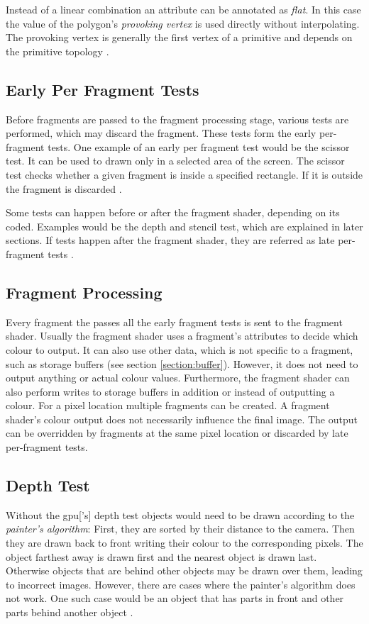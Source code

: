 Instead of a linear combination an attribute can be annotated as \textit{flat}. In this case the value of the polygon's \textit{provoking vertex} is used directly without interpolating. The provoking vertex is generally the first vertex of a primitive and depends on the primitive topology \cite{akine:2018:realtime, khronos:vulkan:spec1.1}.

\subsection{Early Per Fragment Tests}
Before fragments are passed to the fragment processing stage, various tests are performed, which may discard the fragment. These tests form the early per-fragment tests. One example of an early per fragment test would be the scissor test. It can be used to drawn only in a selected area of the screen. The scissor test checks whether a given fragment is inside a specified rectangle. If it is outside the fragment is discarded \cite{khronos:vulkan:spec1.1}. 

Some tests can happen before or after the fragment shader, depending on its coded. Examples would be the depth and stencil test, which are explained in later sections. If tests happen after the fragment shader, they are referred as late per-fragment tests \cite{khronos:vulkan:spec1.1}.

\subsection{Fragment Processing}
\label{section:fragmentprocessing}
Every fragment the passes all the early fragment tests is sent to the fragment shader. Usually the fragment shader uses a fragment's attributes to decide which colour to output.
It can also use other data, which is not specific to a fragment, such as storage buffers (see section \ref{section:buffer}). However, it does not need to output anything or actual colour values.  Furthermore, the fragment shader can also perform writes to storage buffers in addition or instead of outputting a colour. For a pixel location multiple fragments can be created. A fragment shader's colour output does not necessarily influence the final image. The output can be overridden by fragments at the same pixel location or discarded by late per-fragment tests.


\subsection{Depth Test}
\label{section:depthtest}
Without the \gls{gpu}['s] depth test objects would need to be drawn according to the \textit{painter's algorithm}: First, they are sorted by their distance to the camera. Then they are drawn back to front writing their colour to the corresponding pixels. The object farthest away is drawn first and the nearest object is drawn last. Otherwise objects that are behind other objects may be drawn over them, leading to incorrect images. However, there are cases where the painter's algorithm does not work. One such case would be an object that has parts in front and other parts behind another object \cite{akine:2018:realtime}.

